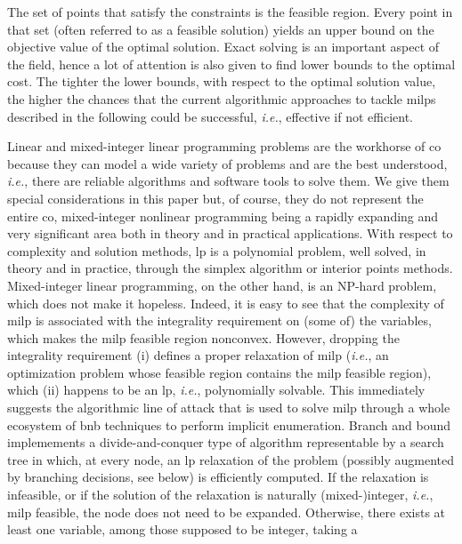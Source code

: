 \documentclass[11pt]{article}
\begin{document}
		The set of points that satisfy the constraints is the feasible region.
		Every point in that set (often referred to as a feasible solution) yields an upper bound on the
		objective value of the optimal solution.
		Exact solving is an important aspect of the field, hence a lot of attention is also given to find
		lower bounds to the optimal cost.
		The tighter the lower bounds, with respect to the optimal solution value, the higher the chances
		that the current algorithmic approaches to tackle \glspl{milp} described in the following could be
		successful, \textit{i.e.}, effective if not efficient.

		Linear and mixed-integer linear programming problems are the workhorse of \gls{co} because they can
		model a wide variety of problems and are the best understood, \textit{i.e.}, there are reliable
		algorithms and software tools to solve them.
		We give them special considerations in this paper but, of course, they do not represent the entire
		\gls{co}, mixed-integer nonlinear programming being a rapidly expanding and very significant area
		both in theory and in practical applications.
		With respect to complexity and solution methods, \gls{lp} is a polynomial problem, well solved, in
		theory and in practice, through the simplex algorithm or interior points methods.
		Mixed-integer linear programming, on the other hand, is an NP-hard problem, which does not make it
		hopeless.
		Indeed, it is easy to see that the complexity of \gls{milp} is associated with the integrality
		requirement on (some of) the variables, which makes the \gls{milp} feasible region nonconvex.
		However, dropping the integrality requirement (i) defines a proper relaxation of \gls{milp}
		(\textit{i.e.}, an optimization problem whose feasible region contains the \gls{milp} feasible
		region), which (ii) happens to be an \gls{lp}, \textit{i.e.}, polynomially solvable.
		This immediately suggests the algorithmic line of attack that is used to solve \gls{milp} through a
		whole ecosystem of \gls{bnb} techniques to perform implicit enumeration.
		Branch and bound implemements a divide-and-conquer type of algorithm representable by a search tree
		in which, at every node, an \gls{lp} relaxation of the problem (possibly augmented by branching
		decisions, see below) is efficiently computed.
		If the relaxation is infeasible, or if the solution of the relaxation is naturally (mixed-)integer,
		\textit{i.e.}, \gls{milp} feasible, the node does not need to be expanded.
		Otherwise, there exists at least one variable, among those supposed to be integer, taking a
\end{document}
